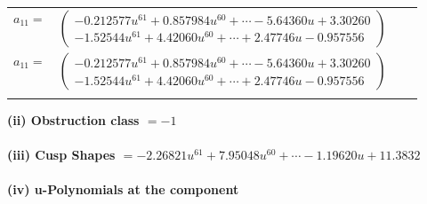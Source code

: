 \documentclass[1p]{elsarticle_modified}
\theoremstyle{definition}
\begin{document}
\begin{tabular}{m{7pt} m{180pt} m{7pt} m{180pt} }
\flushright $a_{11}=$&$\begin{pmatrix}-0.212577 u^{61}+0.857984 u^{60}+\cdots-5.64360 u+3.30260\\-1.52544 u^{61}+4.42060 u^{60}+\cdots+2.47746 u-0.957556\end{pmatrix}$\\ \flushright $a_{11}=$&$\begin{pmatrix}-0.212577 u^{61}+0.857984 u^{60}+\cdots-5.64360 u+3.30260\\-1.52544 u^{61}+4.42060 u^{60}+\cdots+2.47746 u-0.957556\end{pmatrix}$\\&\end{tabular}
\flushleft \textbf{(ii) Obstruction class $= -1$}\\~\\
\flushleft \textbf{(iii) Cusp Shapes $= -2.26821 u^{61}+7.95048 u^{60}+\cdots-1.19620 u+11.3832$}\\~\\
\newpage\renewcommand{\arraystretch}{1}
\flushleft \textbf{(iv) u-Polynomials at the component}\newline \\
\end{document}
